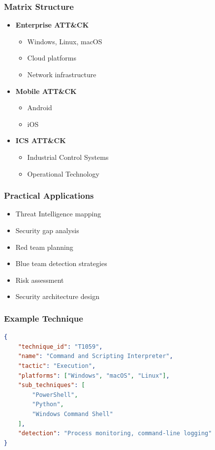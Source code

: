 \subsubsection{Matrix Structure}
\begin{itemize}
    \item \textbf{Enterprise ATT\&CK}
    \begin{itemize}
        \item Windows, Linux, macOS
        \item Cloud platforms
        \item Network infrastructure
    \end{itemize}
    
    \item \textbf{Mobile ATT\&CK}
    \begin{itemize}
        \item Android
        \item iOS
    \end{itemize}
    
    \item \textbf{ICS ATT\&CK}
    \begin{itemize}
        \item Industrial Control Systems
        \item Operational Technology
    \end{itemize}
\end{itemize}

\subsubsection{Practical Applications}
\begin{itemize}
    \item Threat Intelligence mapping
    \item Security gap analysis
    \item Red team planning
    \item Blue team detection strategies
    \item Risk assessment
    \item Security architecture design
\end{itemize}



\subsubsection{Example Technique}
\begin{lstlisting}[language=JSON]
{
    "technique_id": "T1059",
    "name": "Command and Scripting Interpreter",
    "tactic": "Execution",
    "platforms": ["Windows", "macOS", "Linux"],
    "sub_techniques": [
        "PowerShell",
        "Python",
        "Windows Command Shell"
    ],
    "detection": "Process monitoring, command-line logging"
}
\end{lstlisting}

